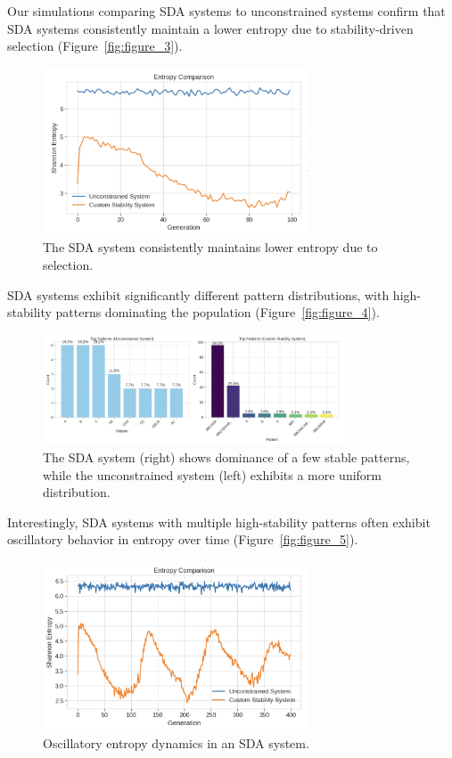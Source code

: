 \documentclass[preprint,12pt]{elsarticle}
\begin{document}
Our simulations comparing SDA systems to unconstrained systems confirm that SDA systems consistently maintain a lower entropy due to stability-driven selection (Figure~\ref{fig:figure_3}).

\begin{figure}[h]
    \centering
    \includegraphics[width=0.7\textwidth]{figure_3.png}
    \caption{The SDA system consistently maintains lower entropy due to selection.}
    \label{fig:entropy_comparison}
\end{figure}

SDA systems exhibit significantly different pattern distributions, with high-stability patterns dominating the population (Figure~\ref{fig:figure_4}).

\begin{figure}[h]
    \centering
    \includegraphics[width=0.8\textwidth]{figure_4}
    \caption{The SDA system (right) shows dominance of a few stable patterns, while the unconstrained system (left) exhibits a more uniform distribution.}
    \label{fig:pattern_distribution}
\end{figure}

Interestingly, SDA systems with multiple high-stability patterns often exhibit oscillatory behavior in entropy over time (Figure~\ref{fig:figure_5}).

\begin{figure}[h]
    \centering
    \includegraphics[width=0.7\textwidth]{figure_5}
    \caption{Oscillatory entropy dynamics in an SDA system.}
    \label{fig:entropy_oscillations}
\end{figure}
\end{document}
